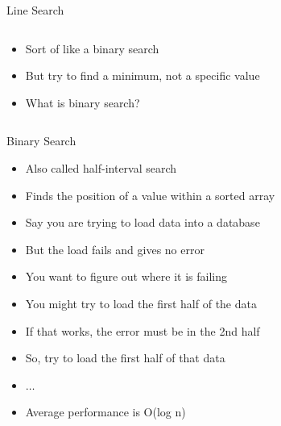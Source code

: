 \documentclass[aspectratio=169]{beamer}
\begin{document}
\begin{frame}{Line Search}

\begin{columns}[T]
\begin{column}{0.6\textwidth}
\begin{itemize}
\item Sort of like a binary search
\item But try to find a minimum, not a specific value
\item What is binary search?
\end{itemize}
\end{column}
\begin{column}{0.4\textwidth}
\end{column}
\end{columns}
	
\end{frame}

\begin{frame}{Binary Search}

\begin{itemize}
\item Also called half-interval search
\item Finds the position of a value within a sorted array
\item Say you are trying to load data into a database
\item But the load fails and gives no error
\item You want to figure out where it is failing
\item You might try to load the first half of the data 
\item If that works, the error must be in the 2nd half
\item So, try to load the first half of that data 
\item $\ldots$
\item Average performance is O(log n)
\end{itemize}

	
\end{frame}
\end{document}
